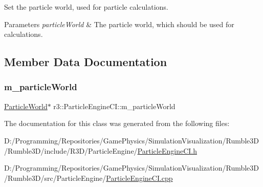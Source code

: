 Set the particle world, used for particle calculations. 


\begin{DoxyParams}{Parameters}
{\em particle\+World} & The particle world, which should be used for calculations. \\
\hline
\end{DoxyParams}


\subsection{Member Data Documentation}
\mbox{\label{classr3_1_1_particle_engine_c_i_ad13321df475d526a7a2ed34e46cc10ee}} 
\subsubsection{\texorpdfstring{m\+\_\+particle\+World}{m\_particleWorld}}
{\footnotesize\ttfamily \mbox{\hyperlink{classr3_1_1_particle_world}{Particle\+World}}$\ast$ r3\+::\+Particle\+Engine\+C\+I\+::m\+\_\+particle\+World\hspace{0.3cm}{\ttfamily [protected]}}



The documentation for this class was generated from the following files\+:\begin{DoxyCompactItemize}
\item 
D\+:/\+Programming/\+Repositories/\+Game\+Physics/\+Simulation\+Visualization/\+Rumble3\+D/\+Rumble3\+D/include/\+R3\+D/\+Particle\+Engine/\mbox{\hyperlink{_particle_engine_c_i_8h}{Particle\+Engine\+C\+I.\+h}}\item 
D\+:/\+Programming/\+Repositories/\+Game\+Physics/\+Simulation\+Visualization/\+Rumble3\+D/\+Rumble3\+D/src/\+Particle\+Engine/\mbox{\hyperlink{_particle_engine_c_i_8cpp}{Particle\+Engine\+C\+I.\+cpp}}\end{DoxyCompactItemize}
